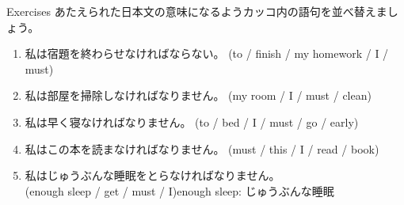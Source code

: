 \documentclass[aspectratio=169,xcolor={dvipsnames,table}]{beamer}
\begin{document}
\begin{frame}[plain]{Exercises}
あたえられた日本文の意味になるようカッコ内の語句を並べ替えましょう。
\begin{enumerate}
 \item 私は宿題を終わらせなければならない。
(to / finish / my homework / I / must)\\
 \item 私は部屋を掃除しなければなりません。
(my room / I / must / clean)\\
 \item 私は早く寝なければなりません。
(to / bed / I / must / go / early)\\
 \item 私はこの本を読まなければなりません。
(must / this / I / read / book)\\
 \item 私はじゅうぶんな睡眠をとらなければなりません。\\
(enough sleep / get / must / I)\hfill{\footnotesize enough sleep: じゅうぶんな睡眠}\\
\end{enumerate}

\end{frame}
\end{document}
